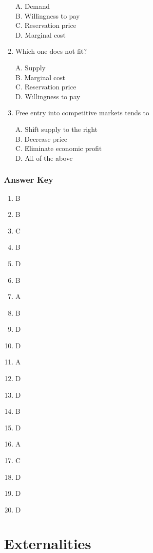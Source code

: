 \documentclass[
]{book}
\providecommand{\tightlist}{%
  \setlength{\itemsep}{0pt}\setlength{\parskip}{0pt}}
\begin{document}
\begin{enumerate}
  A. Demand\\
  B. Willingness to pay\\
  C. Reservation price\\
  D. Marginal cost
\item
  Which one does not fit?

  A. Supply\\
  B. Marginal cost\\
  C. Reservation price\\
  D. Willingness to pay
\item
  Free entry into competitive markets tends to

  A. Shift supply to the right\\
  B. Decrease price\\
  C. Eliminate economic profit\\
  D. All of the above
\end{enumerate}

\hypertarget{answer-key-5}{%
\subsection{Answer Key}\label{answer-key-5}}

\begin{enumerate}
\def\labelenumi{\arabic{enumi}.}
\tightlist
\item
  B
\item
  B
\item
  C
\item
  B
\item
  D
\item
  B
\item
  A
\item
  B
\item
  D
\item
  D
\item
  A
\item
  D
\item
  D
\item
  B
\item
  D
\item
  A
\item
  C
\item
  D
\item
  D
\item
  D
\end{enumerate}

\hypertarget{externalities}{%
\chapter{Externalities}\label{externalities}}
\end{document}
